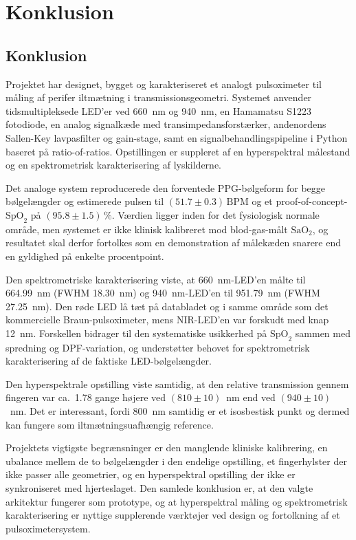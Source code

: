 \chapter{Konklusion}
\label{chap:conclusion}

\section{Konklusion}
Projektet har designet, bygget og karakteriseret et analogt pulsoximeter til måling af perifer iltmætning i transmissionsgeometri. Systemet anvender tidsmultipleksede LED'er ved \SI{660}{nm} og \SI{940}{nm}, en Hamamatsu S1223 fotodiode, en analog signalkæde med transimpedansforstærker, andenordens Sallen-Key lavpasfilter og gain-stage, samt en signalbehandlingspipeline i Python baseret på ratio-of-ratios. Opstillingen er suppleret af en hyperspektral målestand og en spektrometrisk karakterisering af lyskilderne.

Det analoge system reproducerede den forventede PPG-bølgeform for begge bølgelængder og estimerede pulsen til $(51.7 \pm 0.3)\,\mathrm{BPM}$ og et proof-of-concept-$\text{SpO}_2$ på $(95.8 \pm 1.5)\,\%$. Værdien ligger inden for det fysiologisk normale område, men systemet er ikke klinisk kalibreret mod blod-gas-målt $\text{SaO}_2$, og resultatet skal derfor fortolkes som en demonstration af målekæden snarere end en gyldighed på enkelte procentpoint.

Den spektrometriske karakterisering viste, at \SI{660}{nm}-LED'en målte til \SI{664.99}{nm} (FWHM \SI{18.30}{nm}) og \SI{940}{nm}-LED'en til \SI{951.79}{nm} (FWHM \SI{27.25}{nm}). Den røde LED lå tæt på databladet og i samme område som det kommercielle Braun-pulsoximeter, mens NIR-LED'en var forskudt med knap \SI{12}{nm}. Forskellen bidrager til den systematiske usikkerhed på $\text{SpO}_2$ sammen med spredning og DPF-variation, og understøtter behovet for spektrometrisk karakterisering af de faktiske LED-bølgelængder.

Den hyperspektrale opstilling viste samtidig, at den relative transmission gennem fingeren var ca.\ \num{1.78} gange højere ved $(810 \pm 10)$~nm end ved $(940 \pm 10)$~nm. Det er interessant, fordi \SI{800}{nm} samtidig er et isosbestisk punkt og dermed kan fungere som iltmætningsuafhængig reference.

Projektets vigtigste begrænsninger er den manglende kliniske kalibrering, en ubalance mellem de to bølgelængder i den endelige opstilling, et fingerhylster der ikke passer alle geometrier, og en hyperspektral opstilling der ikke er synkroniseret med hjerteslaget. Den samlede konklusion er, at den valgte arkitektur fungerer som prototype, og at hyperspektral måling og spektrometrisk karakterisering er nyttige supplerende værktøjer ved design og fortolkning af et pulsoximetersystem.


